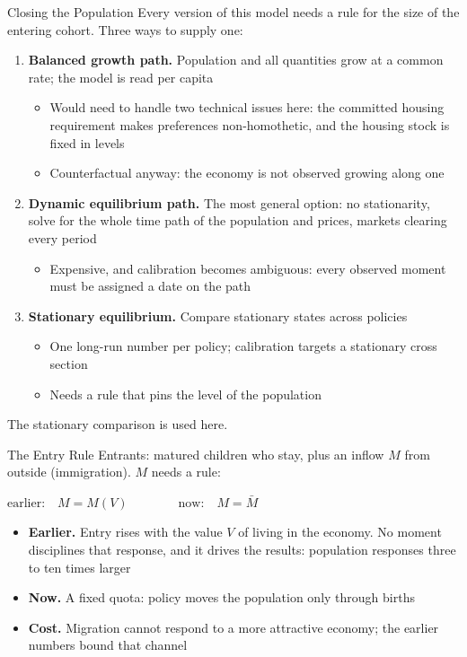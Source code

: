 \documentclass[11pt,aspectratio=169]{beamer}
\begin{document}
\begin{frame}{Closing the Population}
Every version of this model needs a rule for the size of the entering cohort. Three ways to supply one:
\begin{enumerate}
  \item \textbf{Balanced growth path.} Population and all quantities grow at a common rate; the model is read per capita
  \begin{itemize}
    \item Would need to handle two technical issues here: the committed housing requirement makes preferences non-homothetic, and the housing stock is fixed in levels
    \item Counterfactual anyway: the economy is not observed growing along one
  \end{itemize}
  \item \textbf{Dynamic equilibrium path.} The most general option: no stationarity, solve for the whole time path of the population and prices, markets clearing every period
  \begin{itemize}
    \item Expensive, and calibration becomes ambiguous: every observed moment must be assigned a date on the path
  \end{itemize}
  \item \textbf{Stationary equilibrium.} Compare stationary states across policies
  \begin{itemize}
    \item One long-run number per policy; calibration targets a stationary cross section
    \item Needs a rule that pins the level of the population
  \end{itemize}
\end{enumerate}
The stationary comparison is used here.
\end{frame}

\begin{frame}{The Entry Rule}
Entrants: matured children who stay, plus an inflow $M$ from outside (immigration). $M$ needs a rule:
\begin{center}
$\text{earlier:}\quad M = M(V)
\qquad\qquad
\text{now:}\quad M = \bar M$
\end{center}
\smallskip
\begin{itemize}
  \item \textbf{Earlier.} Entry rises with the value $V$ of living in the economy. No moment disciplines that response, and it drives the results: population responses three to ten times larger
  \item \textbf{Now.} A fixed quota: policy moves the population only through births
  \item \textbf{Cost.} Migration cannot respond to a more attractive economy; the earlier numbers bound that channel
\end{itemize}
\end{frame}
\end{document}
